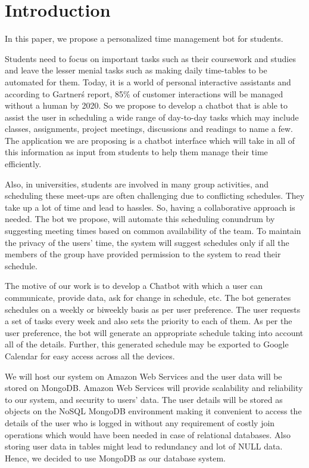 \documentclass{sig-alternate-05-2015}
\begin{document}
\section{Introduction}
\par
In this paper, we propose a personalized time management bot for students.
\par
Students need to focus on important tasks such as their coursework and studies and leave the lesser menial tasks such as making daily time-tables to be automated for them. Today, it is a world of personal interactive assistants and according to Gartner\'s report\cite{planner1}, 85\% of customer interactions will be managed without a human by 2020. So we propose to develop a chatbot that is able to assist the user in scheduling a wide range of day-to-day tasks which may include classes, assignments, project meetings, discussions and readings to name a few. The application we are proposing is a chatbot interface which will take in all of this information as input from students to help them manage their time efficiently. 
\par
Also, in universities, students are involved in many group activities, and scheduling these meet-ups are often challenging due to conflicting schedules. They take up a lot of time and lead to hassles. So, having a collaborative approach is needed. The bot we propose, will automate this scheduling conundrum by suggesting meeting times based on common availability of the team. To maintain the privacy of the users' time, the system will suggest schedules only if all the members of the group have provided permission to the system to read their schedule.
\par
The motive of our work is to develop a Chatbot with which a user can communicate, provide data, ask for change in schedule, etc. The bot generates schedules on a weekly or biweekly basis as per user preference. The user requests a set of tasks every week and also sets the priority to each of them. As per the user preference, the bot will generate an appropriate schedule taking into account all of the details. Further, this generated schedule may be exported to Google Calendar for easy access across all the devices.
\par
We will host our system on Amazon Web Services and the user data will be stored on MongoDB. Amazon Web Services will provide scalability and reliability  to our system, and security to users' data. The user details will be stored as objects on the NoSQL MongoDB environment making it convenient to access the details of the user who is logged in without any  requirement of costly join operations which would have been needed in case of relational databases. Also storing user data in tables might lead to redundancy and lot of NULL data. Hence, we decided to use MongoDB as our database system.
\end{document}
